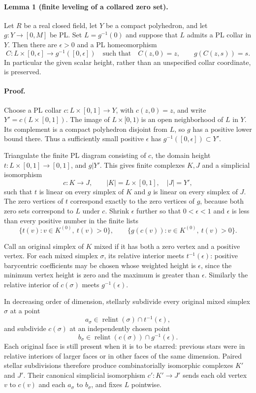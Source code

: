\paragraph{Lemma 1 (finite leveling of a collared zero set).}
Let $R$ be a real closed field, let $Y$ be a compact polyhedron, and let
$g:Y\to[0,M]$ be PL. Set $L=g^{-1}(0)$ and suppose that $L$ admits a PL collar
in $Y$. Then there are $\epsilon>0$ and a PL homeomorphism
\[
 C:L\times[0,\epsilon]\longrightarrow g^{-1}([0,\epsilon])
 \quad\text{such that}\quad
 C(z,0)=z,\qquad g(C(z,s))=s.
 \tag{A5.16.1}
\]
In particular the given scalar height, rather than an unspecified collar
coordinate, is preserved.

\paragraph{Proof.}
Choose a PL collar $c:L\times[0,1]\to Y$, with $c(z,0)=z$, and write
$Y'=c(L\times[0,1])$. The image of $L\times[0,1)$ is an open neighborhood
of $L$ in $Y$. Its complement is a compact polyhedron disjoint from $L$,
so $g$ has a positive lower bound there. Thus a sufficiently small positive
$\epsilon$ has $g^{-1}([0,\epsilon])\subset Y'$.

Triangulate the finite PL diagram consisting of $c$, the domain height
$t:L\times[0,1]\to[0,1]$, and $g|Y'$. This gives finite complexes $K,J$
and a simplicial isomorphism
\[
 c:K\longrightarrow J,
 \qquad |K|=L\times[0,1],\quad |J|=Y',
\]
such that $t$ is linear on every simplex of $K$ and $g$ is linear on every
simplex of $J$. The zero vertices of $t$ correspond exactly to the zero
vertices of $g$, because both zero sets correspond to $L$ under $c$.
Shrink $\epsilon$ further so that $0<\epsilon<1$ and $\epsilon$ is less
than every positive number in the finite lists
\[
 \{t(v):v\in K^{(0)},\ t(v)>0\},\qquad
 \{g(c(v)):v\in K^{(0)},\ t(v)>0\}.
 \tag{A5.16.2}
\]

Call an original simplex of $K$ mixed if it has both a zero vertex and a
positive vertex. For each mixed simplex $\sigma$, its relative interior
meets $t^{-1}(\epsilon)$: positive barycentric coefficients may be chosen
whose weighted height is $\epsilon$, since the minimum vertex height is
zero and the maximum is greater than $\epsilon$. Similarly the relative
interior of $c(\sigma)$ meets $g^{-1}(\epsilon)$.

In decreasing order of dimension, stellarly subdivide every original mixed
simplex $\sigma$ at a point
\[
 a_\sigma\in\operatorname{relint}(\sigma)\cap t^{-1}(\epsilon),
\]
and subdivide $c(\sigma)$ at an independently chosen point
\[
 b_\sigma\in\operatorname{relint}(c(\sigma))\cap g^{-1}(\epsilon).
\]
Each original face is still present when it is to be starred: previous stars
were in relative interiors of larger faces or in other faces of the same
dimension. Paired stellar subdivisions therefore produce combinatorially
isomorphic complexes $K'$ and $J'$. Their canonical simplicial isomorphism
$c':K'\to J'$ sends each old vertex $v$ to $c(v)$ and each $a_\sigma$ to
$b_\sigma$, and fixes $L$ pointwise.

